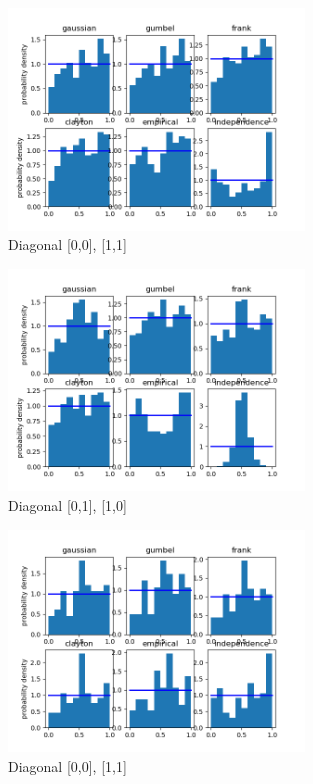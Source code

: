\begin{figure}[h]
	\centering
	\includegraphics[width=0.7\textwidth]{2013-04-05_12_00-2013-04-05_13_00-0.png}
	\caption{Diagonal [0,0], [1,1]}
\end{figure}

\begin{figure}[h]
	\centering
	\includegraphics[width=0.7\textwidth]{2013-04-05_12_00-2013-04-05_13_00-1.png}
	\caption{Diagonal [0,1], [1,0]}
\end{figure}

\clearpage



\begin{figure}[h]
	\centering
	\includegraphics[width=0.7\textwidth]{2013-10-23_17_00-2013-10-23_18_00-0.png}
	\caption{Diagonal [0,0], [1,1]}
\end{figure}

